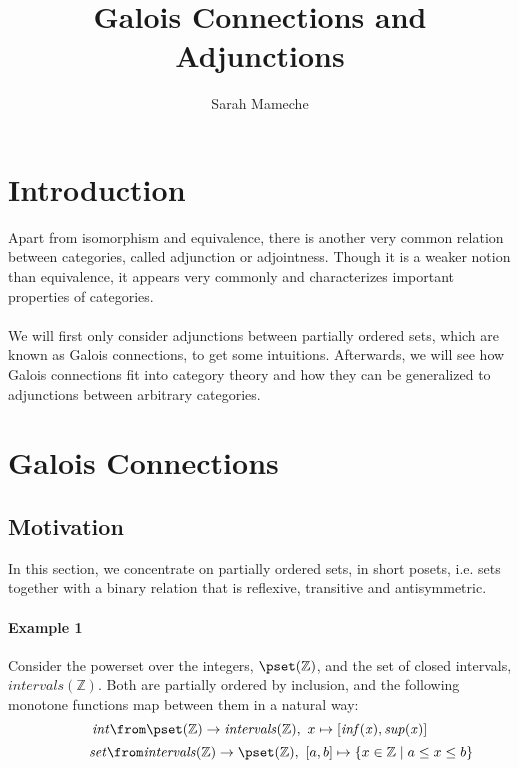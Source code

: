 \def\pathToRoot{../../}
\usepackage{charter}
\selectfont


\title{Galois Connections and Adjunctions}
\author{Sarah Mameche}
\maketitle

\section*{Introduction}
	
	Apart from isomorphism and equivalence, there is another very common relation between categories, called adjunction or adjointness. Though it is a weaker notion than equivalence, it appears very commonly and characterizes important properties of categories.\\\\We will first only consider adjunctions between partially ordered sets, which are known as Galois connections, to get some intuitions. Afterwards, we will see how Galois connections fit into category theory and how they can be generalized to adjunctions between arbitrary categories.\\
\section*{Galois Connections}

\subsection*{Motivation}
	In this section, we concentrate on partially ordered sets, in short posets, i.e. sets together with a binary relation that is reflexive, transitive and antisymmetric.\\ 
\paragraph{Example 1}
	Consider the powerset over the integers, $\pset({\mathbb{Z}})$,  and the set of closed intervals, $\mathit{intervals}({\mathbb{Z}})$. Both are partially ordered by inclusion, and the following monotone functions map between them in a natural way:
	\[\mathit{int} \from \pset({\mathbb{Z}}) \to \mathit{intervals}({\mathbb{Z}}), \,\, x \mapsto [\mathit{inf(x)}, \mathit{sup(x)}]\]
	\[\;\;\;\;\;\;\;\;\;\;\;\mathit{set} \from  \mathit{intervals}({\mathbb{Z}}) \to\pset({\mathbb{Z}}), \,\, [a, b] \mapsto \{x \in \mathbb{Z} \mid a \leq x \leq b \}\]

